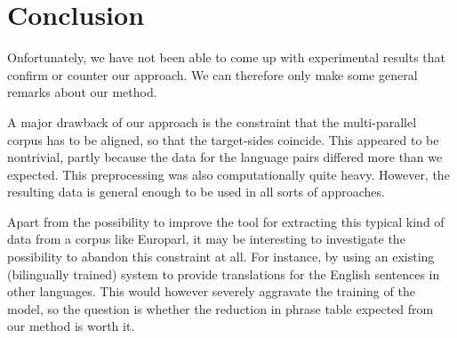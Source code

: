 \documentclass[11pt]{article}
\begin{document}


\section{Conclusion}
Onfortunately, we have not been able to come up with experimental results that confirm or counter our approach. We can therefore only make some general remarks about our method.


A major drawback of our approach is the constraint that the multi-parallel corpus has to be aligned, so that the target-sides coincide. This appeared to be nontrivial, partly because the data for the language pairs differed more than we expected. This preprocessing was also computationally quite heavy. However, the resulting data is general enough to be used in all sorts of approaches.

Apart from the possibility to improve the tool for extracting this typical kind of data from a corpus like Europarl, it may be interesting to investigate the possibility to abandon this constraint at all. For instance, by using an existing (bilingually trained) system to provide translations for the English sentences in other languages. This would however severely aggravate the training of the model, so the question is whether the reduction in phrase table expected from our method is worth it.
\end{document}
